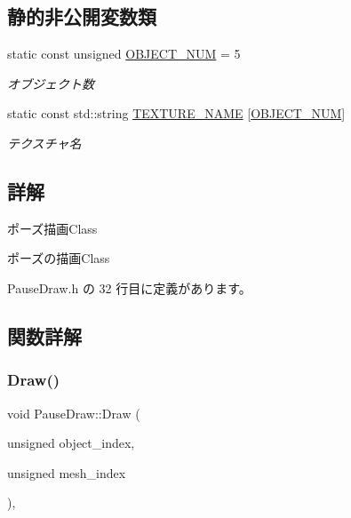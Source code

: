 \subsection*{静的非公開変数類}
\begin{DoxyCompactItemize}
\item 
static const unsigned \mbox{\hyperlink{class_pause_draw_a28303189f2f9cf000bd8f2ca9d55ee05}{O\+B\+J\+E\+C\+T\+\_\+\+N\+UM}} = 5
\begin{DoxyCompactList}\small\item\em オブジェクト数 \end{DoxyCompactList}\item 
static const std\+::string \mbox{\hyperlink{class_pause_draw_adf998344d92e63fa3bfbac4b1ec93c51}{T\+E\+X\+T\+U\+R\+E\+\_\+\+N\+A\+ME}} \mbox{[}\mbox{\hyperlink{class_pause_draw_a28303189f2f9cf000bd8f2ca9d55ee05}{O\+B\+J\+E\+C\+T\+\_\+\+N\+UM}}\mbox{]}
\begin{DoxyCompactList}\small\item\em テクスチャ名 \end{DoxyCompactList}\end{DoxyCompactItemize}


\subsection{詳解}
ポーズ描画\+Class 

ポーズの描画\+Class 

 Pause\+Draw.\+h の 32 行目に定義があります。



\subsection{関数詳解}
\mbox{\label{class_pause_draw_a84a0b8965acd5d9a6021d4a4776a770f}} 
\subsubsection{\texorpdfstring{Draw()}{Draw()}}
{\footnotesize\ttfamily void Pause\+Draw\+::\+Draw (\begin{DoxyParamCaption}\item[{unsigned}]{object\+\_\+index,  }\item[{unsigned}]{mesh\+\_\+index }\end{DoxyParamCaption})\hspace{0.3cm}{\ttfamily [override]}, {\ttfamily [virtual]}}



